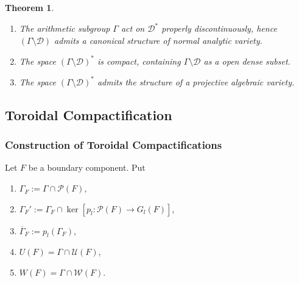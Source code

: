 \documentclass[11pt,english]{smfart}
\newtheorem{theorem}{Theorem}
\theoremstyle{definition}
\theoremstyle{remark}
\newcommand{\R}{\mathbb{R}}
\renewcommand{\C}{\mathbb{C}}
\DeclareMathOperator{\Sp}{Sp}
\DeclareMathOperator{\Uni}{U}
\newcommand{\under}{\!\setminus\!}
\renewcommand{\bar}{\overline}
\begin{document}
\begin{theorem}
    \begin{enumerate}
        \item[(1)] The arithmetic subgroup $\Gamma$ act on $\mathcal{D}^*$ properly discontinuously, hence $(\Gamma\under\mathcal{D})$ admits a canonical structure of normal analytic variety.
        \item[(2)] The space $(\Gamma\under\mathcal{D})^*$ is compact, containing $\Gamma\under\mathcal{D}$ as a open dense subset.
        \item[(3)] The space $(\Gamma\under\mathcal{D})^*$ admits the structure of a projective algebraic variety.
    \end{enumerate}
\end{theorem}

\subsection{Toroidal Compactification}

\subsubsection{Construction of Toroidal Compactifications}
Let $F$ be a boundary component. Put
\begin{enumerate}
    \item[] $\Gamma_F := \Gamma\cap\mathcal{P}(F)$,
    \item[] $\Gamma_F' := \Gamma_F\cap\ker[p_l:\mathcal{P}(F)\to G_l(F)]$,
    \item[] $\bar{\Gamma}_F := p_l(\Gamma_F)$,
    \item[] $U(F) = \Gamma\cap\mathcal{U}(F)$,
    \item[] $W(F) = \Gamma\cap\mathcal{W}(F)$.
\end{enumerate}
\end{document}
